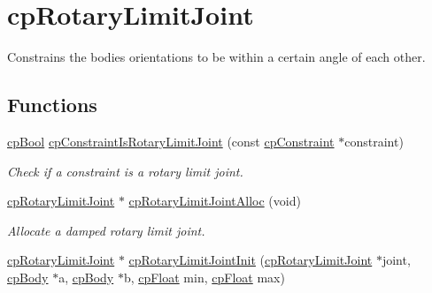 \hypertarget{group__cp_rotary_limit_joint}{}\section{cp\+Rotary\+Limit\+Joint}
\label{group__cp_rotary_limit_joint}


Constrains the bodies\textquotesingle{} orientations to be within a certain angle of each other.  


\subsection*{Functions}
\begin{DoxyCompactItemize}
\item 
\hypertarget{group__cp_rotary_limit_joint_gaf586161a847e816e61cd44d1828e4957}{}\hyperlink{group__basic_types_gabc5e752c48f3449ca26ef413ecbd647e}{cp\+Bool} \hyperlink{group__cp_rotary_limit_joint_gaf586161a847e816e61cd44d1828e4957}{cp\+Constraint\+Is\+Rotary\+Limit\+Joint} (const \hyperlink{structcp_constraint}{cp\+Constraint} $\ast$constraint)\label{group__cp_rotary_limit_joint_gaf586161a847e816e61cd44d1828e4957}

\begin{DoxyCompactList}\small\item\em Check if a constraint is a rotary limit joint. \end{DoxyCompactList}\item 
\hypertarget{group__cp_rotary_limit_joint_ga188c8abeede5f9f878ec7a04e6d9af9b}{}\hyperlink{structcp_rotary_limit_joint}{cp\+Rotary\+Limit\+Joint} $\ast$ \hyperlink{group__cp_rotary_limit_joint_ga188c8abeede5f9f878ec7a04e6d9af9b}{cp\+Rotary\+Limit\+Joint\+Alloc} (void)\label{group__cp_rotary_limit_joint_ga188c8abeede5f9f878ec7a04e6d9af9b}

\begin{DoxyCompactList}\small\item\em Allocate a damped rotary limit joint. \end{DoxyCompactList}\item 
\hypertarget{group__cp_rotary_limit_joint_ga3f849df8d2439c089147f48646f0a551}{}\hyperlink{structcp_rotary_limit_joint}{cp\+Rotary\+Limit\+Joint} $\ast$ \hyperlink{group__cp_rotary_limit_joint_ga3f849df8d2439c089147f48646f0a551}{cp\+Rotary\+Limit\+Joint\+Init} (\hyperlink{structcp_rotary_limit_joint}{cp\+Rotary\+Limit\+Joint} $\ast$joint, \hyperlink{structcp_body}{cp\+Body} $\ast$a, \hyperlink{structcp_body}{cp\+Body} $\ast$b, \hyperlink{group__basic_types_gac1ed65573e035bf892505768c852d8d3}{cp\+Float} min, \hyperlink{group__basic_types_gac1ed65573e035bf892505768c852d8d3}{cp\+Float} max)\label{group__cp_rotary_limit_joint_ga3f849df8d2439c089147f48646f0a551}


\end{DoxyCompactItemize}

